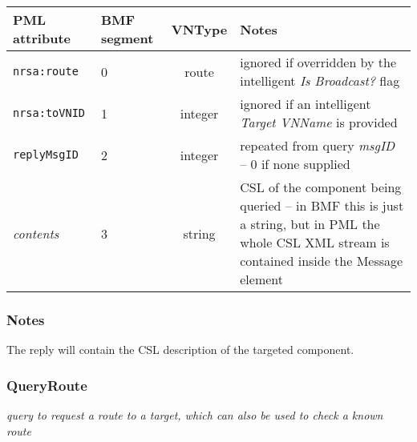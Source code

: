 \documentclass[pdftex,a4paper]{article}
\newcommand{\XMLfont}[1]{{\tt \small #1}}
\begin{document}
\begin{table}[!h]
  \begin{center}
    \label{tab:ReplyCSL}
    \begin{tabular}{|l|p{13mm}|c|p{60mm}|}
      \hline

      \textbf{PML attribute} & \textbf{BMF segment} & \textbf{VNType}
      & \textbf{Notes} \\\hline

      \XMLfont{nrsa:route} & 0 & route & ignored if overridden by the
      intelligent {\em Is Broadcast?} flag \\ \hline

      \XMLfont{nrsa:toVNID} & 1 & integer & ignored if an intelligent {\em
      Target VNName} is provided \\\hline

      \XMLfont{replyMsgID} & 2 & integer & repeated from query {\em
      msgID} -- 0 if none supplied \\\hline

      {\em contents} & 3 & string & CSL of the component being queried
      -- in BMF this is just a string, but in PML the whole CSL XML
      stream is contained inside the Message element \\\hline

    \end{tabular}
  \end{center}
\end{table}

\subsubsection*{Notes}

The reply will contain the CSL description of the targeted component.

\clearpage

\subsubsection{QueryRoute}

{\em query to request a route to a target, which can also be used to
  check a known route}
\end{document}
